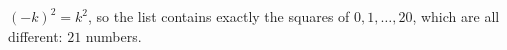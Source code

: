 $(-k)^2=k^2$, so the list contains exactly the squares of $0,1,\dots,20$, which are all different: $\boxed{21}$ numbers.

